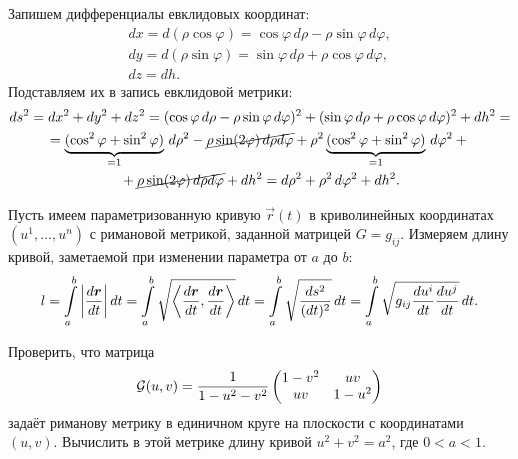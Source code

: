 \begin{solution}
	Запишем дифференциалы евклидовых координат:
	\begin{gather*}
		dx = d(\rho\cos\varphi) = \cos\varphi\,d\rho - \rho\sin\varphi\,d\varphi,\\
		dy = d(\rho\sin\varphi) = \sin\varphi\,d\rho + \rho\cos\varphi\,d\varphi,\\
		dz = dh.
	\end{gather*}
	Подставляем их в запись евклидовой метрики:
	\begin{multline*}
		ds^2 = dx^2 + dy^2 + dz^2 = (\cos\varphi\,d\rho - \rho\sin\varphi\,d\varphi)^2 + (\sin\varphi\,d\rho + \rho\cos\varphi\,d\varphi)^2 + dh^2 =\\ = \underbrace{(\cos^2\varphi + \sin^2\varphi)}_{= 1}\,d\rho^2 - \cancel{\rho\sin(2\varphi)\,d\rho d\varphi} + \rho^2\underbrace{(\cos^2\varphi + \sin^2\varphi)}_{= 1}\,d\varphi^2 + {}\\{} + \cancel{\rho\sin(2\varphi)\,d\rho d\varphi} + dh^2 = d\rho^2 + \rho^2\,d\varphi^2 + dh^2.
	\end{multline*}
\end{solution}

Пусть имеем параметризованную кривую $\vec{r}(t)$ в криволинейных координатах $(u^1, \ldots, u^n)$ с римановой метрикой, заданной матрицей $G = g_{ij}$. Измеряем длину кривой, заметаемой при изменении параметра от $a$ до $b$:
\begin{equation} \label{eq:RiemannLength}
	l = \int\limits_a^b\left\lvert\frac{d\boldsymbol{r}}{dt}\right\rvert dt = \int\limits_a^b\sqrt{\left\langle \frac{d\boldsymbol{r}}{dt}, \frac{d\boldsymbol{r}}{dt} \right\rangle}\,dt = \int\limits_a^b\sqrt{\frac{ds^2}{(dt)^2}}\,dt = \int\limits_a^b\sqrt{g_{ij}\frac{du^i}{dt}\frac{du^j}{dt}}\,dt.
\end{equation}

\begin{problem}
	Проверить, что матрица
	\[
		\mathcal{G}(u, v) = \frac{1}{1 - u^2 - v^2}
		\begin{pmatrix}
			1 - v^2 & uv\\
			uv & 1 - u^2
		\end{pmatrix}
	\]
	задаёт риманову метрику в единичном круге на плоскости с координатами $(u, v)$. Вычислить в этой метрике длину кривой $u^2 + v^2 = a^2$, где $0 < a < 1$.
\end{problem}


